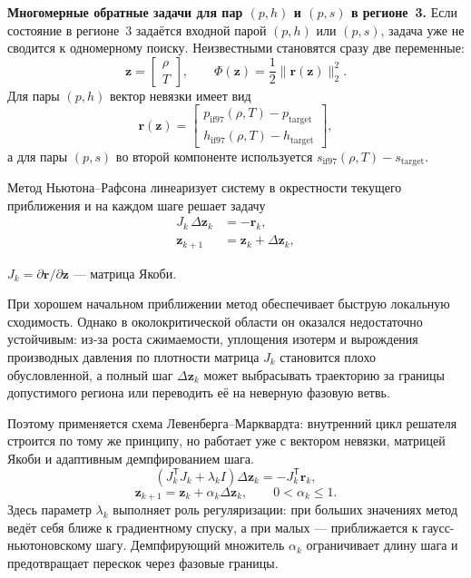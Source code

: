 \textbf{Многомерные обратные задачи для пар $(p, h)$ и $(p, s)$ в регионе~3.}
Если состояние в регионе~3 задаётся входной парой $(p, h)$
или $(p, s)$,
задача уже не сводится к одномерному поиску.
Неизвестными становятся сразу две переменные:
\begin{equation}
\mathbf{z} =
\left[
\begin{array}{c}
\rho \\
T
\end{array}
\right],
\qquad
\Phi(\mathbf{z}) = \frac{1}{2}\|\mathbf{r}(\mathbf{z})\|_{2}^{2}.
\end{equation}
Для пары $(p, h)$ вектор невязки имеет вид
\begin{equation}
\mathbf{r}(\mathbf{z}) =
\left[
\begin{array}{c}
p_{\mathrm{if97}}(\rho, T) - p_{\mathrm{target}} \\
h_{\mathrm{if97}}(\rho, T) - h_{\mathrm{target}}
\end{array}
\right],
\end{equation}
а для пары $(p, s)$
во второй компоненте используется
$s_{\mathrm{if97}}(\rho, T) - s_{\mathrm{target}}$.

Метод Ньютона--Рафсона
линеаризует систему в окрестности текущего приближения
и на каждом шаге решает задачу
\begin{equation}
\begin{aligned}
J_{k}\,\Delta \mathbf{z}_{k} &= -\mathbf{r}_{k}, \\
\mathbf{z}_{k+1} &= \mathbf{z}_{k} + \Delta \mathbf{z}_{k},
\end{aligned}
\end{equation}
\begin{gostwhere}
\item $J_{k} = \partial \mathbf{r}/\partial \mathbf{z}$ --- матрица Якоби.
\end{gostwhere}

При хорошем начальном приближении
метод обеспечивает быструю локальную сходимость.
Однако в околокритической области
он оказался недостаточно устойчивым:
из-за роста сжимаемости,
уплощения изотерм и вырождения производных давления по плотности
матрица $J_{k}$ становится плохо обусловленной,
а полный шаг $\Delta \mathbf{z}_{k}$
может выбрасывать траекторию за границы допустимого региона
или переводить её на неверную фазовую ветвь.

Поэтому применяется
схема Левенберга--Марквардта:
внутренний цикл решателя строится по тому же принципу,
но работает уже с вектором невязки, матрицей Якоби
и адаптивным демпфированием шага.
\begin{equation}
\left(J_{k}^{\mathsf{T}}J_{k} + \lambda_{k} I\right)\Delta \mathbf{z}_{k}
= -J_{k}^{\mathsf{T}}\mathbf{r}_{k},
\end{equation}
\begin{equation}
\mathbf{z}_{k+1} = \mathbf{z}_{k} + \alpha_{k}\Delta \mathbf{z}_{k},
\qquad
0 < \alpha_{k} \le 1.
\end{equation}
Здесь параметр $\lambda_{k}$ выполняет роль регуляризации:
при больших значениях метод ведёт себя ближе к градиентному спуску,
а при малых --- приближается к гаусс-ньютоновскому шагу.
Демпфирующий множитель $\alpha_{k}$
ограничивает длину шага
и предотвращает перескок через фазовые границы.

